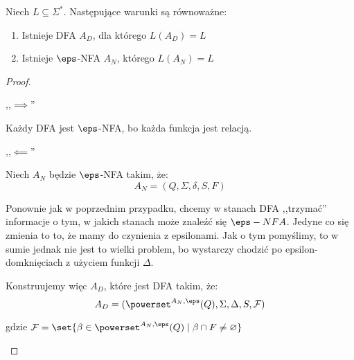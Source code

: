 \begin{theorem}
	Niech \( L \subseteq \Sigma^* \).
	Następujące warunki są równoważne:
	\begin{enumerate}
		\item Istnieje DFA \( A_D \), dla którego \( L(A_D) = L \)
		\item Istnieje \(\eps\)-NFA \( A_N \), którego \( L(A_N) = L \)
	\end{enumerate}
\end{theorem}
\begin{proof}
	\begin{description}
		\item ,,\( \implies \)''

		      Każdy DFA jest \(\eps\)-NFA, bo każda funkcja jest relacją.

		\item ,,\( \impliedby \)''

		      Niech \(A_N\) będzie \(\eps\)-NFA takim, że:
		      \[ A_N = (Q, \Sigma, \delta, S, F) \]

		      Ponownie jak w poprzednim przypadku, chcemy w stanach DFA ,,trzymać'' informacje o tym, w jakich stanach może znaleźć się \(\eps-NFA\). Jedyne co się zmienia to to, że mamy do czynienia z epsilonami. Jak o tym pomyślimy, to w sumie jednak nie jest to wielki problem, bo wystarczy chodzić po epsilon-domknięciach z użyciem funkcji \( \Delta \).

		      Konstruujemy więc \(A_D\), które jest DFA takim, że:
		      \[ A_D = (\powerset^{A_N, \eps}(Q), \Sigma, \Delta, S, \mathcal{F})\]

		      gdzie \( \mathcal{F} = \set{\beta \in \powerset^{A_N, \eps}(Q) \mid \beta \cap F \neq \varnothing} \)
	\end{description}
\end{proof}